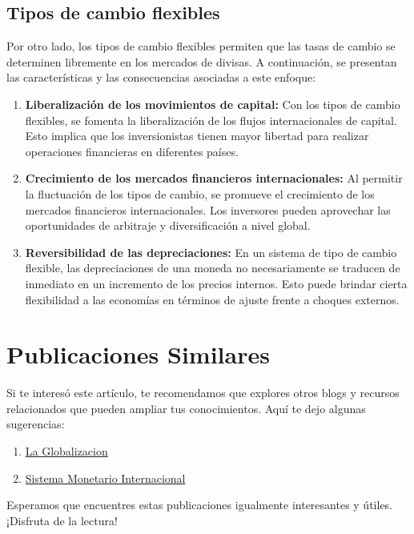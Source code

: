\documentclass[
  jou,
  floatsintext,
  longtable,
  a4paper,
  nolmodern,
  notxfonts,
  notimes,
  12pt,
  colorlinks=true,linkcolor=blue,citecolor=blue,urlcolor=blue]{apa7}
\providecommand{\tightlist}{%
  \setlength{\itemsep}{0pt}\setlength{\parskip}{0pt}}
\begin{document}
\subsection{Tipos de cambio flexibles}\label{tipos-de-cambio-flexibles}

Por otro lado, los tipos de cambio flexibles permiten que las tasas de
cambio se determinen libremente en los mercados de divisas. A
continuación, se presentan las características y las consecuencias
asociadas a este enfoque:

\begin{enumerate}
\def\labelenumi{\arabic{enumi}.}
\item
  \textbf{Liberalización de los movimientos de capital:} Con los tipos
  de cambio flexibles, se fomenta la liberalización de los flujos
  internacionales de capital. Esto implica que los inversionistas tienen
  mayor libertad para realizar operaciones financieras en diferentes
  países.
\item
  \textbf{Crecimiento de los mercados financieros internacionales:} Al
  permitir la fluctuación de los tipos de cambio, se promueve el
  crecimiento de los mercados financieros internacionales. Los
  inversores pueden aprovechar las oportunidades de arbitraje y
  diversificación a nivel global.
\item
  \textbf{Reversibilidad de las depreciaciones:} En un sistema de tipo
  de cambio flexible, las depreciaciones de una moneda no necesariamente
  se traducen de inmediato en un incremento de los precios internos.
  Esto puede brindar cierta flexibilidad a las economías en términos de
  ajuste frente a choques externos.
\end{enumerate}

\section{Publicaciones Similares}\label{publicaciones-similares}

Si te interesó este artículo, te recomendamos que explores otros blogs y
recursos relacionados que pueden ampliar tus conocimientos. Aquí te dejo
algunas sugerencias:

\begin{enumerate}
\def\labelenumi{\arabic{enumi}.}
\tightlist
\item
  \href{https://pecunia-fluxus.netlify.app/finanzas-internacionales/2023-06-16-la-globalizacion/index.pdf}{}
  \href{https://pecunia-fluxus.netlify.app/finanzas-internacionales/2023-06-16-la-globalizacion}{La
  Globalizacion}
\item
  \href{https://pecunia-fluxus.netlify.app/finanzas-internacionales/2023-06-17-sistema-monetario-internacional/index.pdf}{}
  \href{https://pecunia-fluxus.netlify.app/finanzas-internacionales/2023-06-17-sistema-monetario-internacional}{Sistema
  Monetario Internacional}
\end{enumerate}

Esperamos que encuentres estas publicaciones igualmente interesantes y
útiles. ¡Disfruta de la lectura!
\end{document}
